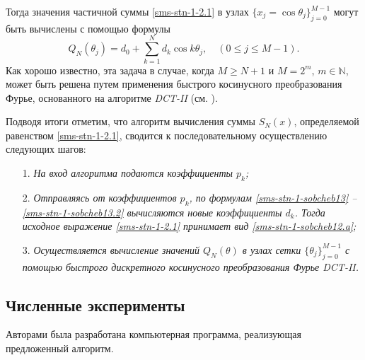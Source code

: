 Тогда  значения частичной суммы  \eqref{sms-stn-1-2.1} в узлах $\{x_j = \cos\theta_j\}_{j=0}^{M-1}$ %
могут быть вычислены с помощью формулы
\begin{equation}\label{sms-stn-1-sobcheb12.a}
Q_N(\theta_j) =
d_{0} + \sum_{k=1}^{N}  d_{k} \cos{k \theta_j}, \quad (0\le j\le M-1).
\end{equation}
Как хорошо известно, эта задача
в случае, когда $M \ge N+1$ и $M=2^{m}$, $m \in \mathbb{N}$,
может быть решена путем применения быстрого косинусного преобразования Фурье, основанного на алгоритме \textit{DCT-II} (см. \cite{sms-stn-1-dctBook}).

Подводя итоги отметим, что алгоритм вычисления суммы $S_N(x)$, определяемой равенством \eqref{sms-stn-1-2.1}, сводится к последовательному осуществлению следующих шагов:

\begin{enumerate}
	\item[1.] \textit{
		На вход алгоритма подаются коэффициенты $p_{k}$;
	}
	\item[2.] \textit{
		Отправляясь от коэффициентов $p_{k}$, по формулам \eqref{sms-stn-1-sobcheb13} -- \eqref{sms-stn-1-sobcheb13.2} вычисляются новые коэффициенты $ d_{k}$.
		Тогда исходное выражение \eqref{sms-stn-1-2.1} принимает вид \eqref{sms-stn-1-sobcheb12.a};
	}
	\item[3.] \textit{
		Осуществляется вычисление значений $Q_N(\theta)$ в узлах сетки $\{\theta_j\}_{j=0}^{M-1}$ с помощью быстрого дискретного косинусного преобразования Фурье DCT-II.
	}
\end{enumerate}

\subsection{Численные эксперименты}
Авторами была разработана компьютерная программа, реализующая предложенный алгоритм.

